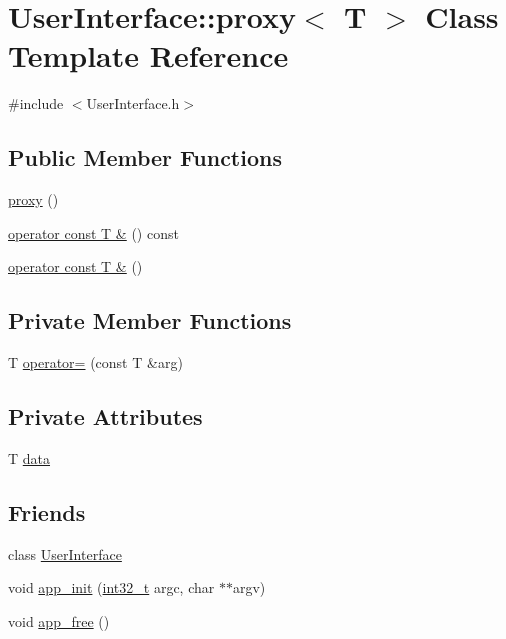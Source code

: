 \section{User\-Interface\-:\-:proxy$<$ T $>$ Class Template Reference}
\label{class_user_interface_1_1proxy}


{\ttfamily \#include $<$User\-Interface.\-h$>$}

\subsection*{Public Member Functions}
\begin{DoxyCompactItemize}
\item 
\hyperlink{class_user_interface_1_1proxy_a1a192470532b54f2a474a9b2caad8d49}{proxy} ()
\item 
\hyperlink{class_user_interface_1_1proxy_ac7a983433d3dd29017a45188338c21b1}{operator const T \&} () const 
\item 
\hyperlink{class_user_interface_1_1proxy_a5e3cad4ce73f0a0281d1655b9ca6f841}{operator const T \&} ()
\end{DoxyCompactItemize}
\subsection*{Private Member Functions}
\begin{DoxyCompactItemize}
\item 
T \hyperlink{class_user_interface_1_1proxy_a01e55fd178489fc3b2e4c4c82199cd30}{operator=} (const T \&arg)
\end{DoxyCompactItemize}
\subsection*{Private Attributes}
\begin{DoxyCompactItemize}
\item 
T \hyperlink{class_user_interface_1_1proxy_a5f38ae21b583b9419bd65bd11b426f36}{data}
\end{DoxyCompactItemize}
\subsection*{Friends}
\begin{DoxyCompactItemize}
\item 
class \hyperlink{class_user_interface_1_1proxy_adb55a5cf0f8d4b17f324a902a7904d97}{User\-Interface}
\item 
void \hyperlink{class_user_interface_1_1proxy_a7ab0624f9c8aeab843f91432c75638ee}{app\-\_\-init} (\hyperlink{stdint_8h_a32f2e37ee053cf2ce8ca28d1f74630e5}{int32\-\_\-t} argc, char $\ast$$\ast$argv)
\item 
void \hyperlink{class_user_interface_1_1proxy_a6d05bd04f7411a8f5441f0f1a7221225}{app\-\_\-free} ()
\end{DoxyCompactItemize}


